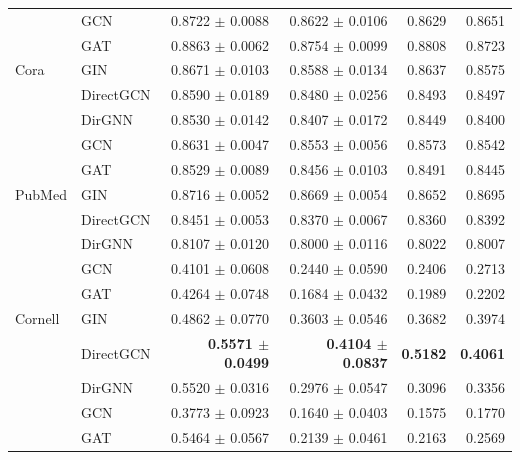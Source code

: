 \documentclass[utf8]{FrontiersinHarvard}
\begin{document}
\begin{longtable}{llrrrr}
		& GCN       & 0.8722 $\pm$ 0.0088          & 0.8622 $\pm$ 0.0106          & 0.8629          & 0.8651          \\
		& GAT       & 0.8863 $\pm$ 0.0062          & 0.8754 $\pm$ 0.0099          & 0.8808          & 0.8723          \\
		Cora      & GIN       & 0.8671 $\pm$ 0.0103          & 0.8588 $\pm$ 0.0134          & 0.8637          & 0.8575          \\
		& DirectGCN & 0.8590 $\pm$ 0.0189          & 0.8480 $\pm$ 0.0256          & 0.8493          & 0.8497          \\
		& DirGNN    & 0.8530 $\pm$ 0.0142          & 0.8407 $\pm$ 0.0172          & 0.8449          & 0.8400          \\
		\midrule
		& GCN       & 0.8631 $\pm$ 0.0047          & 0.8553 $\pm$ 0.0056          & 0.8573          & 0.8542          \\
		& GAT       & 0.8529 $\pm$ 0.0089          & 0.8456 $\pm$ 0.0103          & 0.8491          & 0.8445          \\
		PubMed    & GIN       & 0.8716 $\pm$ 0.0052          & 0.8669 $\pm$ 0.0054          & 0.8652          & 0.8695          \\
		& DirectGCN & 0.8451 $\pm$ 0.0053          & 0.8370 $\pm$ 0.0067          & 0.8360          & 0.8392          \\
		& DirGNN    & 0.8107 $\pm$ 0.0120          & 0.8000 $\pm$ 0.0116          & 0.8022          & 0.8007          \\
		\midrule
		& GCN       & 0.4101 $\pm$ 0.0608          & 0.2440 $\pm$ 0.0590          & 0.2406          & 0.2713          \\
		& GAT       & 0.4264 $\pm$ 0.0748          & 0.1684 $\pm$ 0.0432          & 0.1989          & 0.2202          \\
		Cornell   & GIN       & 0.4862 $\pm$ 0.0770          & 0.3603 $\pm$ 0.0546          & 0.3682          & 0.3974          \\
		& DirectGCN & \textbf{0.5571 $\pm$ 0.0499} & \textbf{0.4104 $\pm$ 0.0837} & \textbf{0.5182} & \textbf{0.4061} \\
		& DirGNN    & 0.5520 $\pm$ 0.0316          & 0.2976 $\pm$ 0.0547          & 0.3096          & 0.3356          \\
		\midrule
		& GCN       & 0.3773 $\pm$ 0.0923          & 0.1640 $\pm$ 0.0403          & 0.1575          & 0.1770          \\
		& GAT       & 0.5464 $\pm$ 0.0567          & 0.2139 $\pm$ 0.0461          & 0.2163          & 0.2569          \\

\end{longtable}
\end{document}
